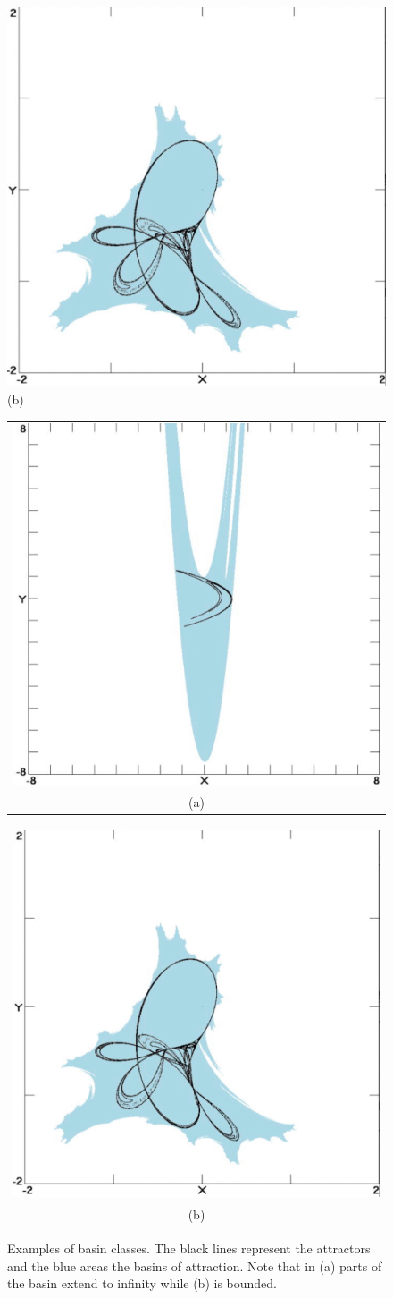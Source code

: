 \begin{figure}
    {{\includegraphics*[width=0.4\linewidth]{figures/IMG_0770.jpg} }}%
    \small (b)
    \fi
    \begin{tabular}[b]{c}
        \includegraphics[width=.4\linewidth]{figures/IMG_0769.jpg} \\
        \small (a)
    \end{tabular} \qquad
    \begin{tabular}[b]{c}
        \includegraphics[width=.4\linewidth]{figures/IMG_0770.jpg} \\
        \small (b)
    \end{tabular}



    \caption[Examples of Basin Classes]{Examples of basin classes. The black lines represent the attractors and the blue areas the basins of attraction. Note that in (a) parts of the basin extend to infinity while (b) is bounded. \cite{classify}}%
    \label{fig:classes}%
\end{figure}

